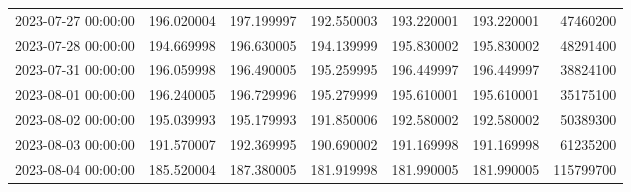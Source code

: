 \begin{tabular}{lrrrrrr}
2023-07-27 00:00:00 & 196.020004 & 197.199997 & 192.550003 & 193.220001 & 193.220001 & 47460200 \\
2023-07-28 00:00:00 & 194.669998 & 196.630005 & 194.139999 & 195.830002 & 195.830002 & 48291400 \\
2023-07-31 00:00:00 & 196.059998 & 196.490005 & 195.259995 & 196.449997 & 196.449997 & 38824100 \\
2023-08-01 00:00:00 & 196.240005 & 196.729996 & 195.279999 & 195.610001 & 195.610001 & 35175100 \\
2023-08-02 00:00:00 & 195.039993 & 195.179993 & 191.850006 & 192.580002 & 192.580002 & 50389300 \\
2023-08-03 00:00:00 & 191.570007 & 192.369995 & 190.690002 & 191.169998 & 191.169998 & 61235200 \\
2023-08-04 00:00:00 & 185.520004 & 187.380005 & 181.919998 & 181.990005 & 181.990005 & 115799700 \\
\bottomrule
\end{tabular}
